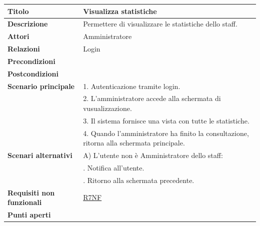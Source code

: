 \documentclass[a4paper]{article}
\begin{document}
  \begin{center}
    \begin{tabularx}{1\textwidth}{l|X}
        \textbf{Titolo} & Visualizza statistiche \\
        \hline
        \textbf{Descrizione} & Permettere di visualizzare le statistiche dello staff. \\
        \hline
        \textbf{Attori} & Amministratore \\
        \hline
        \textbf{Relazioni} & Login \\
        \hline
        \textbf{Precondizioni} &  \\
        \hline
        \textbf{Postcondizioni} &  \\
        \hline
        \textbf{Scenario principale} & 1. Autenticazione tramite login. \\
                                     & 2. L'amministratore accede alla schermata di vusualizzazione. \\
                                     & 3. Il sistema fornisce una vista con tutte le statistiche. \\
                                     & 4. Quando l'amministratore ha finito la consultazione, ritorna alla schermata principale.\\
        \hline
        \textbf{Scenari alternativi} & A) L'utente non è Amministratore dello staff: \\
                                     & \quad 1. Notifica all'utente. \\
                                     & \quad 2. Ritorno alla schermata precedente. \\
        \hline
        \textbf{Requisiti non funzionali} & \hyperlink{R7NF}{R7NF} \\
        \hline
        \textbf{Punti aperti} & \\
        \hline
    \end{tabularx}
  \end{center}


\end{document}

